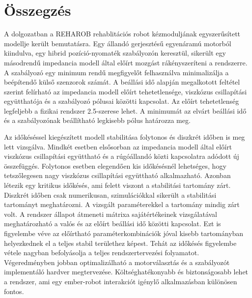 \chapter{Összegzés}\label{chap:summary}

A dolgozatban a REHAROB rehablitációs robot kézmoduljának egyszerűsített modellje került bemutatásra. Egy állandó 
gerjesztésű egyenáramú motorból kiindulva, egy hibrid pozíció-nyomaték szabályozón keresztül, sikerült egy másodrendű 
impedancia modell által előírt mozgást rákényszeríteni a rendszerre. A szabályozó egy minimum rendű megfigyelőt 
felhasználva minimalizálja a beépítendő külső szenzorok számát. A beállási idő alapján megalkotott feltétel 
szerint felírható az impedancia modell előírt tehetetlensége, viszkózus csillapítási együtthatója és a szabályozó 
pólusai közötti kapcsolat. Az előírt tehetetlenség legfeljebb a fizikai rendszer 2.5-szerese lehet. A minimumát az 
elvárt beállási idő és a szabályozónak beállítható legkisebb pólus határozza meg. 

Az időkéséssel kiegészített modell stabilitása folytonos és diszkrét időben is meg lett vizsgálva. Mindkét 
esetben elsősorban az impedancia modell által előírt viszkózus csillapítási együttható és a rúgóállandó közti 
kapcsolatra adódott új összefüggés. Folytonos esetben elegendően kis időkésésnél lehetséges, hogy tetszőlegesen 
nagy viszkózus csillapítási együttható alkalmazható. Azonban létezik egy kritikus időkésés, ami felett viszont 
a stabilitási tartomány zárt. Diszkrét időben csak numerikusan, szimulációkkal sikerült a stabilitási tartományt
meghatározni. A vizsgált paraméterekkel a tartomány mindig zárt volt. A rendszer állapot átmeneti mátrixa sajátértékeinek
vizsgálatával meghatározható a valós és az előírt beállási idő közötti kapcsolat. Ezt is figyelembe véve az 
előírtható paraméterkombinációk jóval kisebb tartományban helyezkednek el a teljes stabil területhez képest. Tehát 
az időkésés figyelembe vétele nagyban befolyásolja a teljes rendszertervezési folyamatot. Végeredményben jobban 
optimalizálható a motorválasztás és a szabályozót implementáló hardver megtervezése. Költséghatékonyabb és biztonságosabb 
lehet a rendszer, ami egy ember-robot interakciót igénylő alkalmazásban különösen fontos. 

